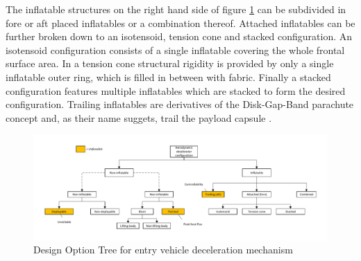 The inflatable structures on the right hand side of figure \ref{fig:dotconfig} can be subdivided in fore or aft placed inflatables or a combination thereof. Attached inflatables can be further broken down to an isotensoid, tension cone and stacked configuration. An isotensoid configuration consists of a single inflatable covering the whole frontal surface area. In a tension cone structural rigidity is provided by only a single inflatable outer ring, which is filled in between with fabric. Finally a stacked configuration features multiple inflatables which are stacked to form the desired configuration. \cite{Smith2011, Yamada2009, Hughes2005} Trailing inflatables are derivatives of the Disk-Gap-Band parachute concept and, as their name suggets, trail the payload capsule \cite{Smith2010}.

\begin{figure}[H]
\centering
\hspace{-10mm}
\includegraphics[width = 1.1\textwidth]{Figure/DOT_configuration.pdf}
\caption{Design Option Tree for entry vehicle deceleration mechanism}
\label{fig:dotconfig}
\end{figure}


